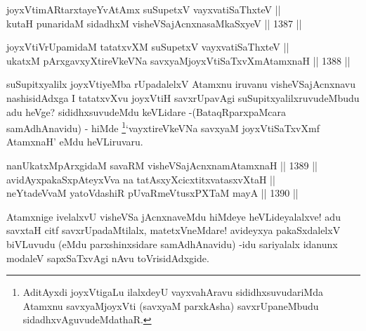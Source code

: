 
\begin{shl}
joyxVtimARtarxtayeYvA\s \s tAmx suSupetxV vayxvatiSaThxteV ||  \\
kutaH punaridaM sidadhxM visheVSajAcnxnasaMkaSxyeV \hfill || 1387 ||  
\end{shl}
				
\begin{shl}
joyxVtiVrUpamidaM tatatxvXM suSupetxV vayxvatiSaThxteV || \\
ukatxM pArxgavxyXtireVkeVNa savxyaMjoyxVtiSaTxvXmAtamxnaH \hfill || 1388 ||  
\end{shl}

\begin{artha}
suSupitxyalilx joyxVtiyeMba rUpadalelxV Atamxnu iruvanu visheVSajAcnxnavu nashisidAdxga I tatatxvXvu joyxVtiH savxrUpavAgi suSupitxyalilxruvudeMbudu adu heVge? sididhxsuvudeMdu keVLidare -(BataqRparxpaMcara samAdhAnavidu) - hiMde \footnote{AditAyxdi joyxVtigaLu ilalxdeyU vayxvahAravu sididhxsuvudariMda Atamxnu savxyaMjoyxVti (savxyaM parxkAsha) savxrUpaneMbudu sidadhxvAguvudeMdathaR.}`vayxtireVkeVNa savxyaM joyxVtiSaTxvXmf AtamxnaH' eMdu heVLiruvaru.
\end{artha}


\begin{shl}
nanUkatxM\footnotemark[1] pArxgidaM savaRM visheVSajAcnxnamAtamxnaH \hfill || 1389 ||  \\
avidAyxpakaSxpAteyxVva na tatAsxyXcicxtitxvatasxvXtaH ||  \\
neYtadeVvaM yatoV\s dashiR pUvaRmeVtusxPXTaM mayA \hfill || 1390 ||  
\end{shl}

\begin{artha}
Atamxnige ivelalxvU visheVSa jAcnxnaveMdu hiMdeye heVLideyalalxve! adu savxtaH citf savxrUpadaMtilalx, matetxVneMdare! avideyxya pakaSxdalelxV biVLuvudu (eMdu parxshinxsidare samAdhAnavidu) -idu sariyalalx idanunx modaleV sapxSaTxvAgi nAvu toVrisidAdxgide.
\end{artha}

